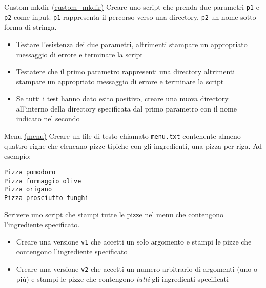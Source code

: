 \begin{esercizio}{Custom mkdir \href{run:./files/linux/mockup_verifica/es3/}{(custom\_mkdir)}}
	Creare uno script  che prenda due parametri \verb|p1| e \verb|p2| come input. \verb|p1| rappresenta il percorso verso una directory, \verb|p2| un nome sotto forma di stringa.
	\begin{itemize}
		\item Testare l’esistenza dei due parametri, altrimenti stampare un appropriato messaggio di errore e terminare la script
		\item Testatere che il primo parametro rappresenti una directory altrimenti stampare un appropriato messaggio di errore e terminare la script
		\item Se tutti i test hanno dato esito positivo, creare una nuova directory all’interno della directory specificata dal primo parametro con il nome indicato nel secondo
	\end{itemize}
\end{esercizio}
\begin{esercizio}{Menu \href{run:./files/linux/menu/}{(menu)}}
	Creare un file di testo chiamato \texttt{menu.txt} contenente almeno quattro righe che elencano pizze tipiche con gli ingredienti, una pizza per riga. Ad esempio:
	\begin{lstlisting}
Pizza pomodoro
Pizza formaggio olive
Pizza origano
Pizza prosciutto funghi\end{lstlisting}
	Scrivere uno script che stampi tutte le pizze nel menu che contengono l'ingrediente specificato.
	\begin{itemize}
		\item Creare una versione \verb|v1| che accetti un solo argomento e stampi le pizze che contengono l'ingrediente specificato
		\item Creare una versione \verb|v2| che accetti un numero arbitrario di argomenti (uno o più) e stampi le pizze che contengono \textit{tutti} gli ingredienti specificati
	\end{itemize}
\end{esercizio}

